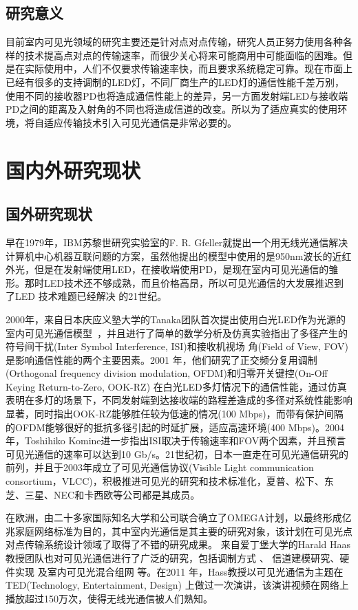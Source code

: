 \subsection{研究意义}
目前室内可见光领域的研究主要还是针对点对点传输，研究人员正努力使用各种各样的技术提高点对点的传输速率，而很少关心将来可能商用中可能面临的困难。但是在实际使用中，人们不仅要求传输速率快，而且要求系统稳定可靠。现在市面上已经有很多的支持调制的LED灯，不同厂商生产的LED灯的通信性能千差万别，使用不同的接收器PD也将造成通信性能上的差异，另一方面发射端LED与接收端PD之间的距离及入射角的不同也将造成信道的改变。所以为了适应真实的使用环境，将自适应传输技术引入可见光通信是非常必要的。

\section{国内外研究现状}\label{sec:stage}
\subsection{国外研究现状}
早在1979年，IBM苏黎世研究实验室的F. R. Gfeller就提出一个用无线光通信解决计算机中心机器互联问题的方案\cite{gfeller1979wireless}，虽然他提出的模型中使用的是950nm波长的近红外光，但是在发射端使用LED，在接收端使用PD，是现在室内可见光通信的雏形。那时LED技术还不够成熟，而且价格高昂，所以可见光通信的大发展推迟到了LED 技术难题已经解决 的21世纪。

2000年，来自日本庆应义塾大学的Tanaka团队首次提出使用白光LED作为光源的室内可见光通信模型\
\cite{tanaka2000wireless}，并且进行了简单的数学分析及仿真实验指出了多径产生的符号间干扰(Inter Symbol Interference, ISI)和接收机视场
角(Field of View, FOV)是影响通信性能的两个主要因素。2001 年，他们研究了正交频分复用调制(Orthogonal frequency division modulation, OFDM)和归零开关键控(On-Off Keying Return-to-Zero, OOK-RZ) 在白光LED多灯情况下的通信性能\cite{tanaka2001indoor}，通过仿真表明在多灯的场景下，不同发射端到达接收端的路程差造成的多径对系统性能影响显著，同时指出OOK-RZ能够胜任较为低速的情况(100 Mbps)，而带有保护间隔的OFDM能够很好的抵抗多径引起的时延扩展，适应高速环境(400 Mbps)。2004年，Toshihiko Komine进一步指出ISI取决于传输速率和FOV两个因素，并且预言可见光通信的速率可以达到10 Gb/s\cite{komine2004fundamental}。21世纪初，日本一直走在可见光通信研究的前列，并且于2003年成立了可见光通信协议(Visible Light
communication consortium，VLCC)，积极推进可见光的研究和技术标准化，夏普、松下、东芝、三星、NEC和卡西欧等公司都是其成员。

在欧洲，由二十多家国际知名大学和公司联合确立了OMEGA计划，以最终形成亿兆家庭网络标准为目的，其中室内光通信是其主要的研究对象，该计划在可见光点对点传输系统设计领域了取得了不错的研究成果\cite{vuvcic2009125,vuvcic2009white,vuvcic2010513,vucic2011803}。 来自爱丁堡大学的Harald Haas教授团队也对可见光通信进行了广泛的研究，包括调制方式
\cite{afgani2006visible,elgala2009indoor,mesleh2010indoor,mesleh2011optical}、 信道建模研究\cite{elgala2009study,elgala2009non}、硬件实现
\cite{stefan2011optical,chun2014demonstration,manousiadis2015demonstration} 及室内可见光混合组网
\cite{wang2015dynamic,stefan2014hybrid,basnayaka2015hybrid} 等。在2011 年，Hass教授以可见光通信为主题在TED(Technology, Entertainment, Design) 上做过一次演讲，该演讲视频在网络上播放超过150万次，使得无线光通信被人们熟知。

